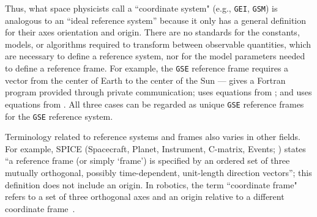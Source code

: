 \documentclass[draft]{agujournal2019}
\begin{document}

Thus, what space physicists call a ``coordinate system" (e.g., \texttt{GEI}, \texttt{GSM}) is analogous to an ``ideal reference system'' because it only has a general definition for their axes orientation and origin. There are no standards for the constants, models, or algorithms required to transform between observable quantities, which are necessary to define a reference system, nor for the model parameters needed to define a reference frame. For example, the \texttt{GSE} reference frame requires a vector from the center of Earth to the center of the Sun ---  gives a Fortran program provided through private communication;  uses equations from ; and  uses equations from . All three cases can be regarded as unique \texttt{GSE} reference frames for the \texttt{GSE} reference system.


Terminology related to reference systems and frames also varies in other fields. For example, SPICE (Spacecraft, Planet, Instrument, C-matrix, Events; ) states ``a reference frame (or simply `frame') is specified by an ordered set of three mutually orthogonal, possibly time-dependent, unit-length direction vectors''; this definition does not include an origin. In robotics, the term ``coordinate frame" refers to a set of three orthogonal axes and an origin relative to a different coordinate frame~\cite{Murray2017}. 
\end{document}
